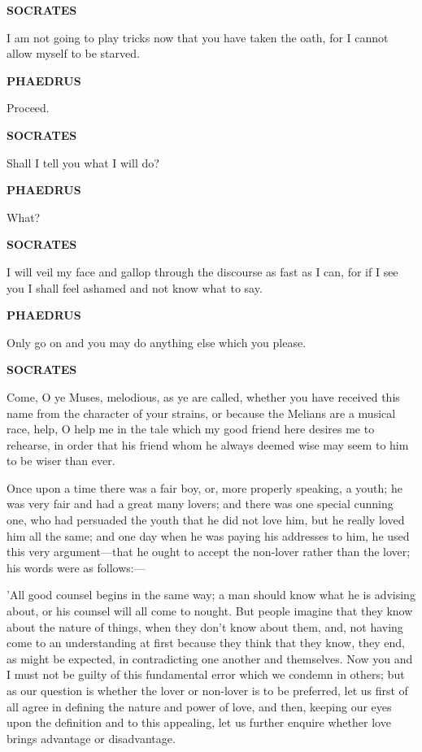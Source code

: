 \documentclass[11pt,letter]{article}
\begin{document}
\par \textbf{SOCRATES}
\par   I am not going to play tricks now that you have taken the oath, for I cannot allow myself to be starved.

\par \textbf{PHAEDRUS}
\par   Proceed.

\par \textbf{SOCRATES}
\par   Shall I tell you what I will do?

\par \textbf{PHAEDRUS}
\par   What?

\par \textbf{SOCRATES}
\par   I will veil my face and gallop through the discourse as fast as I can, for if I see you I shall feel ashamed and not know what to say.

\par \textbf{PHAEDRUS}
\par   Only go on and you may do anything else which you please.

\par \textbf{SOCRATES}
\par   Come, O ye Muses, melodious, as ye are called, whether you have received this name from the character of your strains, or because the Melians are a musical race, help, O help me in the tale which my good friend here desires me to rehearse, in order that his friend whom he always deemed wise may seem to him to be wiser than ever.

\par  Once upon a time there was a fair boy, or, more properly speaking, a youth; he was very fair and had a great many lovers; and there was one special cunning one, who had persuaded the youth that he did not love him, but he really loved him all the same; and one day when he was paying his addresses to him, he used this very argument—that he ought to accept the non-lover rather than the lover; his words were as follows:—

\par  'All good counsel begins in the same way; a man should know what he is advising about, or his counsel will all come to nought. But people imagine that they know about the nature of things, when they don't know about them, and, not having come to an understanding at first because they think that they know, they end, as might be expected, in contradicting one another and themselves. Now you and I must not be guilty of this fundamental error which we condemn in others; but as our question is whether the lover or non-lover is to be preferred, let us first of all agree in defining the nature and power of love, and then, keeping our eyes upon the definition and to this appealing, let us further enquire whether love brings advantage or disadvantage.
\end{document}
